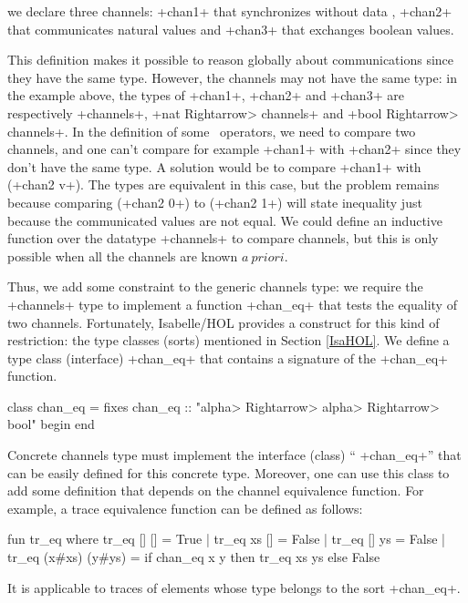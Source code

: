\documentclass[11pt,a4paper]{article}
\begin{document}
\noindent we declare three channels: \inlineisar+chan1+ that synchronizes without data , 
\inlineisar+chan2+ that communicates natural values and \inlineisar+chan3+ that exchanges boolean values.

This definition %
makes it possible to reason globally about communications since they have the same type. 
However, the channels may not have the same type:
in the example above, the types of \inlineisar+chan1+, \inlineisar+chan2+ and \inlineisar+chan3+ are 
respectively \inlineisar+channels+, \inlineisar+nat \<Rightarrow> channels+ and \inlineisar+bool \<Rightarrow> channels+. 
In the definition of some \Circus\ operators, we need to compare two channels, 
and one can't compare for example \inlineisar+chan1+ with \inlineisar+chan2+ since they don't have 
the same type. A solution would be to compare %
\inlineisar+chan1+ with (\inlineisar+chan2 v+). The types are equivalent in this case, but the problem 
remains because comparing (\inlineisar+chan2 0+) to (\inlineisar+chan2 1+) will state inequality just 
because the communicated values are not equal. We could define an inductive function over the datatype 
\inlineisar+channels+ to compare channels, but this is only possible when all the channels are known $a~priori$. 

Thus,  %
we add some constraint to the generic channels type: we require the \inlineisar+channels+ type to 
implement a function \inlineisar+chan_eq+ that tests the equality of two channels. Fortunately, 
Isabelle/HOL provides a %
construct for this kind of restriction: the type classes (sorts) mentioned in Section \ref{IsaHOL}. 
We define a type class (interface) \inlineisar+chan_eq+ that contains a signature of the \inlineisar+chan_eq+ function.
\begin{isar}
class chan_eq = 
  fixes chan_eq :: "\<alpha> \<Rightarrow>  \<alpha>  \<Rightarrow> bool"
begin end
\end{isar}
Concrete channels type %
must implement the interface (class) `` \inlineisar+chan_eq+'' that can be easily defined for this 
concrete type. Moreover, one can use this class to add some definition that depends on the channel 
equivalence function. For example, a trace equivalence function can be defined as follows:
\begin{isar}
fun tr_eq where
  tr_eq [] [] = True | tr_eq xs [] = False | tr_eq [] ys = False
| tr_eq (x#xs) (y#ys) = if chan_eq x y then tr_eq xs ys else False
\end{isar}
It is applicable to traces of elements whose type belongs to the sort \inlineisar+chan_eq+.
\end{document}
